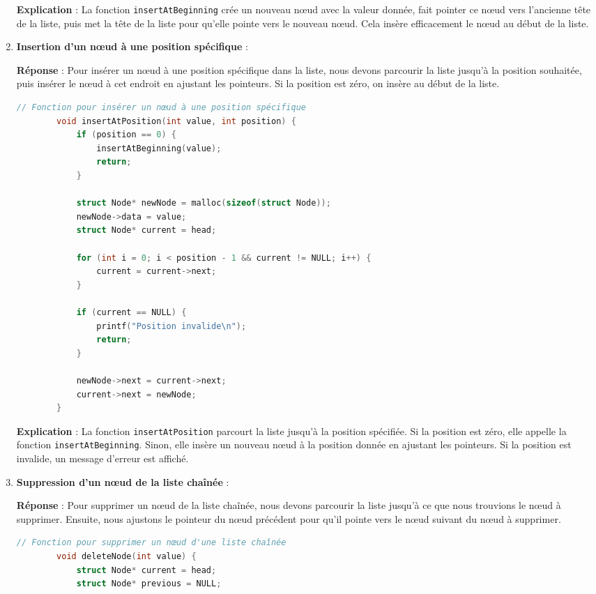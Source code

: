 \begin{enumerate}
	\textbf{Explication} :
	La fonction \texttt{insertAtBeginning} crée un nouveau nœud avec la valeur donnée, fait pointer ce nœud vers l'ancienne tête de la liste, puis met la tête de la liste pour qu'elle pointe vers le nouveau nœud. Cela insère efficacement le nœud au début de la liste.
	
	\item \textbf{Insertion d'un nœud à une position spécifique} :
	
	\textbf{Réponse} :
	Pour insérer un nœud à une position spécifique dans la liste, nous devons parcourir la liste jusqu'à la position souhaitée, puis insérer le nœud à cet endroit en ajustant les pointeurs. Si la position est zéro, on insère au début de la liste.
	
	\begin{lstlisting}[language=C]
		// Fonction pour insérer un nœud à une position spécifique
		void insertAtPosition(int value, int position) {
			if (position == 0) {
				insertAtBeginning(value);
				return;
			}
			
			struct Node* newNode = malloc(sizeof(struct Node));
			newNode->data = value;
			struct Node* current = head;
			
			for (int i = 0; i < position - 1 && current != NULL; i++) {
				current = current->next;
			}
			
			if (current == NULL) {
				printf("Position invalide\n");
				return;
			}
			
			newNode->next = current->next;
			current->next = newNode;
		}
	\end{lstlisting}
	
	\textbf{Explication} :
	La fonction \texttt{insertAtPosition} parcourt la liste jusqu'à la position spécifiée. Si la position est zéro, elle appelle la fonction \texttt{insertAtBeginning}. Sinon, elle insère un nouveau nœud à la position donnée en ajustant les pointeurs. Si la position est invalide, un message d'erreur est affiché.
	
	\item \textbf{Suppression d'un nœud de la liste chaînée} :
	
	\textbf{Réponse} :
	Pour supprimer un nœud de la liste chaînée, nous devons parcourir la liste jusqu'à ce que nous trouvions le nœud à supprimer. Ensuite, nous ajustons le pointeur du nœud précédent pour qu'il pointe vers le nœud suivant du nœud à supprimer.
	
	\begin{lstlisting}[language=C]
		// Fonction pour supprimer un nœud d'une liste chaînée
		void deleteNode(int value) {
			struct Node* current = head;
			struct Node* previous = NULL;
			

\end{lstlisting}
\end{enumerate}
